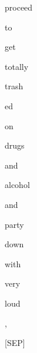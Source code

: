 \documentclass[varwidth=150mm]{standalone}
\begin{document}
\begin{CJK*}{UTF8}{gbsn}
{{{\colorbox{red!5.689702033996582}{\strut proceed} \colorbox{red!4.280144691467285}{\strut to} \colorbox{red!0.0}{\strut get} \colorbox{red!1.406057596206665}{\strut totally} \colorbox{red!0.0}{\strut trash}\colorbox{red!0.0}{\strut ed} \colorbox{red!0.0}{\strut on} \colorbox{red!0.0}{\strut drugs} \colorbox{red!0.0}{\strut and} \colorbox{red!0.0}{\strut alcohol} \colorbox{red!4.085847854614258}{\strut and} \colorbox{red!0.0}{\strut party} \colorbox{red!0.0}{\strut down} \colorbox{red!2.7887535095214844}{\strut with} \colorbox{red!4.053244590759277}{\strut very} \colorbox{red!2.6346797943115234}{\strut loud} \colorbox{red!85.78633117675781}{\strut ,} \colorbox{red!13.84998893737793}{\strut [SEP]}
}}}
\end{CJK*}
\end{document}
